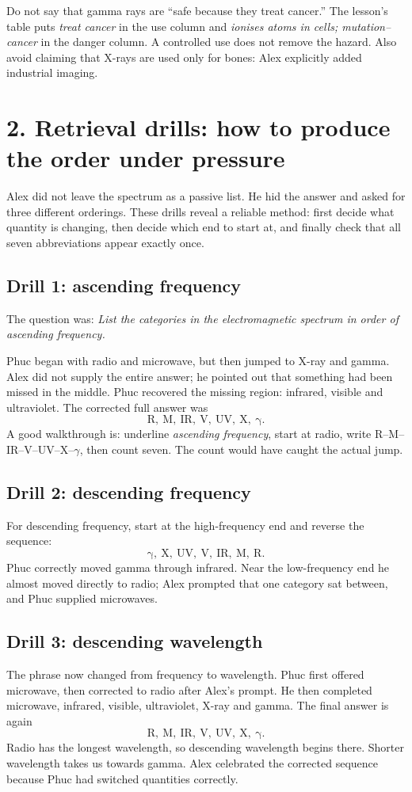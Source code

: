 \documentclass[11pt,a4paper]{article}
\begin{document}
\begin{mistakebox}
Do not say that gamma rays are ``safe because they treat cancer.'' The lesson's table puts \emph{treat cancer} in the use column and \emph{ionises atoms in cells; mutation--cancer} in the danger column. A controlled use does not remove the hazard. Also avoid claiming that X-rays are used only for bones: Alex explicitly added industrial imaging.
\end{mistakebox}

\section*{2. Retrieval drills: how to produce the order under pressure}
Alex did not leave the spectrum as a passive list. He hid the answer and asked for three different orderings. These drills reveal a reliable method: first decide what quantity is changing, then decide which end to start at, and finally check that all seven abbreviations appear exactly once.

\subsection*{Drill 1: ascending frequency}
The question was: \emph{List the categories in the electromagnetic spectrum in order of ascending frequency.}

Phuc began with radio and microwave, but then jumped to X-ray and gamma. Alex did not supply the entire answer; he pointed out that something had been missed in the middle. Phuc recovered the missing region: infrared, visible and ultraviolet. The corrected full answer was
\[
\boxed{\mathrm{R,\ M,\ IR,\ V,\ UV,\ X,\ \gamma}}.
\]
A good walkthrough is: underline \emph{ascending frequency}, start at radio, write R--M--IR--V--UV--X--$\gamma$, then count seven. The count would have caught the actual jump.

\subsection*{Drill 2: descending frequency}
For descending frequency, start at the high-frequency end and reverse the sequence:
\[
\boxed{\mathrm{\gamma,\ X,\ UV,\ V,\ IR,\ M,\ R}}.
\]
Phuc correctly moved gamma through infrared. Near the low-frequency end he almost moved directly to radio; Alex prompted that one category sat between, and Phuc supplied microwaves.

\subsection*{Drill 3: descending wavelength}
The phrase now changed from frequency to wavelength. Phuc first offered microwave, then corrected to radio after Alex's prompt. He then completed microwave, infrared, visible, ultraviolet, X-ray and gamma. The final answer is again
\[
\boxed{\mathrm{R,\ M,\ IR,\ V,\ UV,\ X,\ \gamma}}.
\]
Radio has the longest wavelength, so descending wavelength begins there. Shorter wavelength takes us towards gamma. Alex celebrated the corrected sequence because Phuc had switched quantities correctly.
\end{document}
